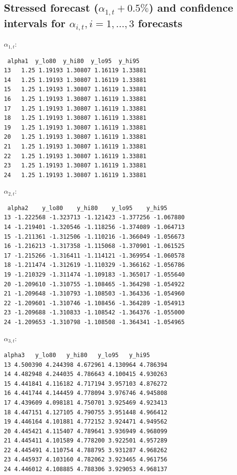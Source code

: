 \subsection{Stressed forecast ($\alpha_{1, t} + 0.5\%$) and confidence intervals for $\alpha_{i, t}, i = 1, \ldots, 3$ forecasts}

$\alpha_{1, t}$:

\begin{verbatim}
 alpha1  y_lo80  y_hi80  y_lo95  y_hi95
13   1.25 1.19193 1.30807 1.16119 1.33881
14   1.25 1.19193 1.30807 1.16119 1.33881
15   1.25 1.19193 1.30807 1.16119 1.33881
16   1.25 1.19193 1.30807 1.16119 1.33881
17   1.25 1.19193 1.30807 1.16119 1.33881
18   1.25 1.19193 1.30807 1.16119 1.33881
19   1.25 1.19193 1.30807 1.16119 1.33881
20   1.25 1.19193 1.30807 1.16119 1.33881
21   1.25 1.19193 1.30807 1.16119 1.33881
22   1.25 1.19193 1.30807 1.16119 1.33881
23   1.25 1.19193 1.30807 1.16119 1.33881
24   1.25 1.19193 1.30807 1.16119 1.33881
\end{verbatim}

$\alpha_{2, t}$:

\begin{verbatim}
 alpha2    y_lo80    y_hi80    y_lo95    y_hi95
13 -1.222568 -1.323713 -1.121423 -1.377256 -1.067880
14 -1.219401 -1.320546 -1.118256 -1.374089 -1.064713
15 -1.211361 -1.312506 -1.110216 -1.366049 -1.056673
16 -1.216213 -1.317358 -1.115068 -1.370901 -1.061525
17 -1.215266 -1.316411 -1.114121 -1.369954 -1.060578
18 -1.211474 -1.312619 -1.110329 -1.366162 -1.056786
19 -1.210329 -1.311474 -1.109183 -1.365017 -1.055640
20 -1.209610 -1.310755 -1.108465 -1.364298 -1.054922
21 -1.209648 -1.310793 -1.108503 -1.364336 -1.054960
22 -1.209601 -1.310746 -1.108456 -1.364289 -1.054913
23 -1.209688 -1.310833 -1.108542 -1.364376 -1.055000
24 -1.209653 -1.310798 -1.108508 -1.364341 -1.054965
\end{verbatim}

$\alpha_{3, t}$:

\begin{verbatim}
alpha3   y_lo80   y_hi80   y_lo95   y_hi95
13 4.500390 4.244398 4.672961 4.130964 4.786394
14 4.482948 4.244035 4.786643 4.100415 4.930263
15 4.441841 4.116182 4.717194 3.957103 4.876272
16 4.441744 4.144459 4.778094 3.976746 4.945808
17 4.439609 4.098181 4.750701 3.925469 4.923413
18 4.447151 4.127105 4.790755 3.951448 4.966412
19 4.446164 4.101881 4.772152 3.924471 4.949562
20 4.445421 4.115407 4.789641 3.936949 4.968099
21 4.445411 4.101589 4.778200 3.922501 4.957289
22 4.445491 4.110754 4.788795 3.931287 4.968262
23 4.445937 4.103160 4.782062 3.923465 4.961756
24 4.446012 4.108885 4.788306 3.929053 4.968137
\end{verbatim}

